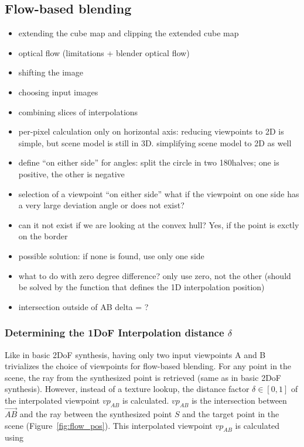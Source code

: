 \subsection{Flow-based blending}
\begin{itemize}
  \item extending the cube map and clipping the extended cube map
  \item optical flow (limitations + blender optical flow)
  \item shifting the image
  \item choosing input images
  \item combining slices of interpolations
  \item per-pixel calculation only on horizontal axis: reducing viewpoints to 2D is simple, but scene model is still in 3D. simplifying scene model to 2D as well
  \item define ``on either side'' for angles: split the circle in two 180\degree halves; one is positive, the other is negative
  \item selection of a viewpoint ``on either side'' \ar what if the viewpoint on one side has a very large deviation angle or does not exist?
  \item can it not exist if we are looking at the convex hull? Yes, if the point is exctly on the border
  \item possible solution: if none is found, use only one side
  \item what to do with zero degree difference? \ar only use zero, not the other (should be solved by the function that defines the 1D interpolation position)
  \item intersection outside of AB \ar delta = ?
\end{itemize}


\subsubsection{Determining the 1DoF Interpolation distance $\delta$} \label{subsec:flow-based-blending}
Like in basic 2DoF synthesis, having only two input viewpoints A and B trivializes the choice of viewpoints for flow-based blending. For any point in the scene, the ray from the synthesized point is retrieved (same as in basic 2DoF synthesis). However, instead of a texture lookup, the distance factor $\delta \in [0,1]$ of the interpolated viewpoint $vp_{AB}$ is calculated. $vp_{AB}$ is the intersection between $\overrightarrow{AB}$ and the ray between the synthesized point $S$ and the target point in the scene (Figure~\ref{fig:flow_pos}). This interpolated viewpoint $vp_{AB}$ is calculated using 

